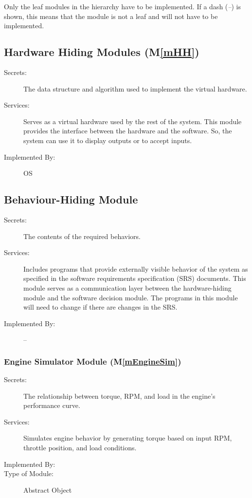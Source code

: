\documentclass[12pt, titlepage]{article}
\newcommand{\mref}[1]{M\ref{#1}}
\begin{document}
Only the leaf modules in the hierarchy have to be implemented. If a dash
(\emph{--}) is shown, this means that the module is not a leaf and will not have
to be implemented.

\subsection{Hardware Hiding Modules (\mref{mHH})}

\begin{description}
\item[Secrets:]The data structure and algorithm used to implement the virtual
  hardware.
\item[Services:]Serves as a virtual hardware used by the rest of the
  system. This module provides the interface between the hardware and the
  software. So, the system can use it to display outputs or to accept inputs.
\item[Implemented By:] OS
\end{description}

\subsection{Behaviour-Hiding Module}

\begin{description}
\item[Secrets:]The contents of the required behaviors.
\item[Services:]Includes programs that provide externally visible behavior of
  the system as specified in the software requirements specification (SRS)
  documents. This module serves as a communication layer between the
  hardware-hiding module and the software decision module. The programs in this
  module will need to change if there are changes in the SRS.
\item[Implemented By:] --
\end{description}

\subsubsection{Engine Simulator Module (\mref{mEngineSim})}

\begin{description}
\item[Secrets:] The relationship between torque, RPM, and load in the engine's performance curve.
\item[Services:] Simulates engine behavior by generating torque based on input RPM, throttle position, and load conditions.
\item[Implemented By:] \progname{}
\item[Type of Module:] Abstract Object
\end{description}
\end{document}

